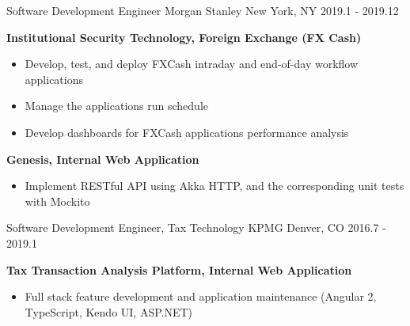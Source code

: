 \begin{cventries}
  \cventry
    {Software Development Engineer} %
    {Morgan Stanley} %
    {New York, NY} %
    {2019.1 - 2019.12} %
    {
      \textbf{Institutional Security Technology, Foreign Exchange (FX Cash)}
      \vspace{1mm}
      \begin{itemize}\itemsep2pt %
          \item {Develop, test, and deploy FXCash intraday and end-of-day workflow applications}
          \item {Manage the applications run schedule}
          \item {Develop dashboards for FXCash applications performance analysis}
      \end{itemize}
      \vspace{1.2mm}
      \textbf{Genesis, Internal Web Application}
      \vspace{1mm}
      \begin{itemize}\itemsep2pt
      \item Implement RESTful API using Akka HTTP, and the corresponding unit tests with Mockito
      \end{itemize}
    }

  \cventry
    {Software Development Engineer, Tax Technology} %
    {KPMG} %
    {Denver, CO} %
    {2016.7 - 2019.1} %
    {
      \textbf{Tax Transaction Analysis Platform, Internal Web Application}
      \vspace{1mm}
      \begin{itemize}\itemsep2pt %
          \item {Full stack feature development and application maintenance (Angular 2, TypeScript, Kendo UI, ASP.NET)}
      \end{itemize}
      \vspace{1.2mm}
    }
\end{cventries}
